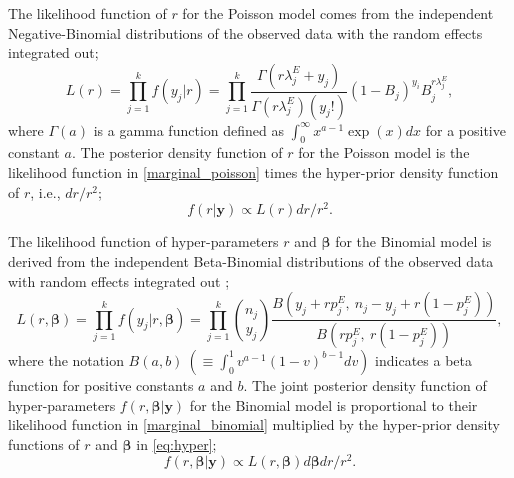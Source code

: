\documentclass[article]{jss}
\begin{document}
The likelihood function of $r$ for the Poisson  model  comes from the independent Negative-Binomial  distributions of the observed data with the random effects integrated out;
\begin{equation}\label{marginal_poisson}
L(r)=\prod_{j=1}^k f(y_j\vert r)=\prod^{k}_{j=1} \frac{\Gamma(r \lambda^E_j+y_j)}{\Gamma(r\lambda^E_j)(y_j!)}(1-B_{j})^{y_{i}}B_{j}^{r \lambda^E_j},
\end{equation}
where $\Gamma(a)$ is a gamma function defined as $\int_0^\infty x^{a-1}\exp(x)dx$ for a positive constant $a$. The posterior density function of $r$  for the Poisson  model is  the likelihood function in  \eqref{marginal_poisson} times the hyper-prior density function of $r$, i.e., $dr/r^2$;
\begin{equation}\label{marginal_post_poisson}
f(r \vert \boldsymbol{y})\propto L(r)dr/r^2.
\end{equation}



The likelihood function of hyper-parameters $r$ and $\boldsymbol{\beta}$ for the Binomial  model is derived from the independent Beta-Binomial  distributions of the observed data with random effects integrated out \citep{skellam1948}; %
\begin{equation}\label{marginal_binomial}
L(r, \boldsymbol{\boldsymbol{\beta}})=\prod_{j=1}^k f(y_j\vert r, \boldsymbol{\boldsymbol{\beta}})=\prod_{j=1}^k\binom{n_j}{y_j}\frac{B(y_j+rp^E_j, ~n_j-y_j+r(1-p^E_j))}{B(rp^E_j, ~r(1-p^E_j))},
\end{equation}
where the notation $B(a, b)~(\equiv\int_0^1 v^{a-1}(1-v)^{b-1}dv)$ indicates a beta function for positive constants $a$ and $b$. The joint posterior density  function of hyper-parameters $f(r, \boldsymbol{\boldsymbol{\beta}}\vert \boldsymbol{y})$ for the Binomial  model is proportional to their likelihood function in \eqref{marginal_binomial} multiplied by the hyper-prior density functions of $r$ and $\boldsymbol{\beta}$ in  \eqref{eq:hyper};
\begin{equation}\label{marginal_post_binomial}
f(r, \boldsymbol{\boldsymbol{\beta}}\vert \boldsymbol{y})\propto L(r, \boldsymbol{\boldsymbol{\beta}})d\boldsymbol{\beta}dr/r^2.
\end{equation}


\end{document}
